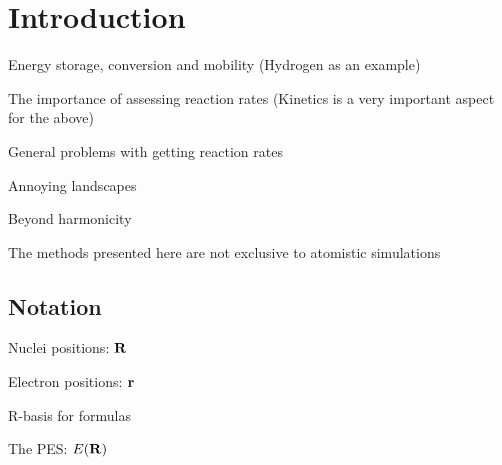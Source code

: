 \chapter{Introduction}
\label{chap:introduction}

\bit
\item Energy storage, conversion and mobility (Hydrogen as an example)
\item The importance of assessing reaction rates (Kinetics is a very important aspect for the above)
\item General problems with getting reaction rates
\item Annoying landscapes
\item Beyond harmonicity
\item The methods presented here are not exclusive to atomistic simulations
\eit

\placeholder

\section{Notation}
\bit
\item Nuclei positions: ${\mathrm{\mathbf{\bm{R}}}}$
\item Electron positions: ${\mathrm{\mathbf{\bm{r}}}}$
\item R-basis for formulas
\item The PES: $E({\mathrm{\mathbf{\bm{R}}}})$
\eit


